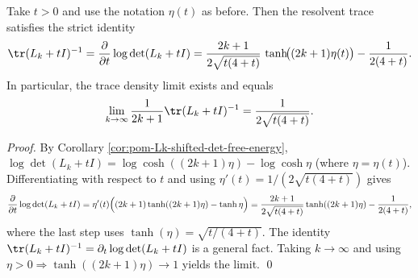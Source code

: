 \begin{corollary}\label{cor:pom-Lk-resolvent-trace-hyperbolic}
Take \(t>0\) and use the notation \(\eta(t)\) as before.
Then the resolvent trace satisfies the strict identity
\[
\tr(L_k+tI)^{-1}
=\frac{\partial}{\partial t}\log\det(L_k+tI)
=\frac{2k+1}{2\sqrt{t(4+t)}}\,\tanh\!\bigl((2k+1)\eta(t)\bigr)-\frac{1}{2(4+t)}.
\]
In particular, the trace density limit exists and equals
\[
\lim_{k\to\infty}\frac{1}{2k+1}\tr(L_k+tI)^{-1}
=\frac{1}{2\sqrt{t(4+t)}}.
\]
\end{corollary}
\begin{proof}
By Corollary \ref{cor:pom-Lk-shifted-det-free-energy},
\(
\log\det(L_k+tI)=\log\cosh((2k+1)\eta)-\log\cosh\eta
\) (where \(\eta=\eta(t)\)).
Differentiating with respect to \(t\) and using \(\eta'(t)=1/(2\sqrt{t(4+t)})\) gives
\[
\frac{\partial}{\partial t}\log\det(L_k+tI)
=\eta'(t)\Bigl((2k+1)\tanh((2k+1)\eta)-\tanh\eta\Bigr)
=\frac{2k+1}{2\sqrt{t(4+t)}}\tanh((2k+1)\eta)-\frac{1}{2(4+t)},
\]
where the last step uses \(\tanh(\eta)=\sqrt{t/(4+t)}\).
The identity \(\tr(L_k+tI)^{-1}=\partial_t\log\det(L_k+tI)\) is a general fact.
Taking \(k\to\infty\) and using \(\eta>0\Rightarrow\tanh((2k+1)\eta)\to 1\) yields the limit. \qed
\end{proof}

